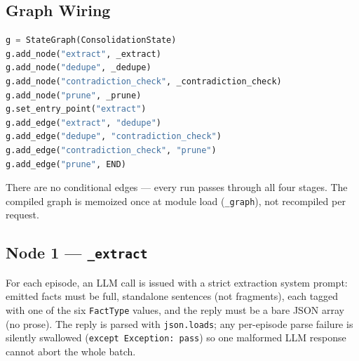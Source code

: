 \documentclass[11pt,a4paper]{report}
\newcommand{\code}[1]{\texttt{\small #1}}
\begin{document}
\subsection{Graph Wiring}

\begin{lstlisting}[language=Python,caption={Linear consolidation graph}]
g = StateGraph(ConsolidationState)
g.add_node("extract", _extract)
g.add_node("dedupe", _dedupe)
g.add_node("contradiction_check", _contradiction_check)
g.add_node("prune", _prune)
g.set_entry_point("extract")
g.add_edge("extract", "dedupe")
g.add_edge("dedupe", "contradiction_check")
g.add_edge("contradiction_check", "prune")
g.add_edge("prune", END)
\end{lstlisting}

There are no conditional edges — every run passes through all four stages. The compiled graph is memoized once at module load (\code{\_graph}), not recompiled per request.

\begin{center}
\end{center}

\subsection{Node 1 — \code{\_extract}}

For each episode, an LLM call is issued with a strict extraction system prompt: emitted facts must be full, standalone sentences (not fragments), each tagged with one of the six \code{FactType} values, and the reply must be a bare JSON array (no prose). The reply is parsed with \code{json.loads}; any per-episode parse failure is silently swallowed (\code{except Exception: pass}) so one malformed LLM response cannot abort the whole batch.
\end{document}
